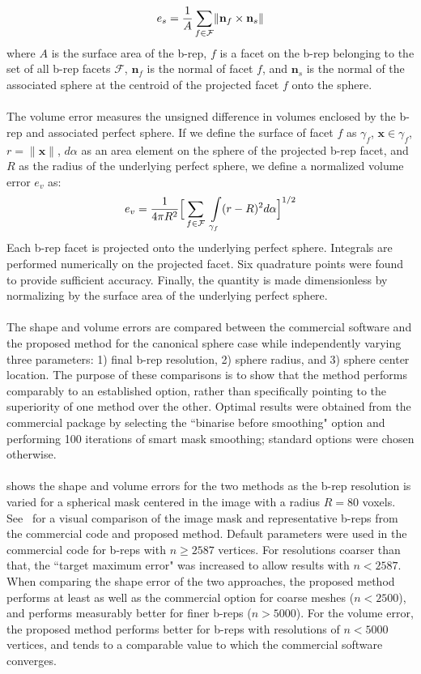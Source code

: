 \begin{equation} 
	e_s = \frac{1}{A} \sum \limits_{f\in\mathcal{F}} \lVert {\bf n}_f \times {\bf n}_s \rVert
\end{equation}
where $A$ is the surface area of the b-rep, $f$ is a facet on the b-rep belonging to the set of all b-rep facets $\mathcal{F}$, ${\bm n}_f$ is the normal of facet $f$, and ${\bm n}_s$ is the normal of the associated sphere at the centroid of the projected facet $f$ onto the sphere. \\ \\
%
The volume error measures the unsigned difference in volumes enclosed by the b-rep and associated perfect sphere. If we define the surface of facet $f$ as $\gamma_f$,  ${\bm x} \in \gamma_f$, $r = \lVert {\bm x} \rVert$, $d\alpha$ as an area element on the sphere of the projected b-rep facet, and $R$ as the radius of the underlying perfect sphere, we define a normalized volume error $e_v$ as:
\begin{equation}
	e_v = \frac{1}{4\pi R^2} \Big[\sum \limits_{f \in \mathcal{F}\textsl{}} \ \int \limits_{\gamma_f} (r - R)^2 d\alpha \Big]^{1/2}
\end{equation}
Each b-rep facet is projected onto the underlying perfect sphere. Integrals are performed numerically on the projected facet. Six quadrature points were found to provide sufficient accuracy. Finally, the quantity is made dimensionless by normalizing by the surface area of the underlying perfect sphere.
\\ \\
%
The shape and volume errors are compared between the commercial software and the proposed method for the canonical sphere case while independently varying three parameters: 1) final b-rep resolution, 2) sphere radius, and 3) sphere center location. The purpose of these comparisons is to show that the method performs comparably to an established option, rather than specifically pointing to the superiority of one method over the other. Optimal results were obtained from the commercial package by selecting the ``binarise before smoothing" option and performing 100 iterations of smart mask smoothing; standard options were chosen otherwise. \\ \\
%
 shows the shape and volume errors for the two methods as the b-rep resolution is varied for a spherical mask centered in the image with a radius $R = 80$ voxels. See~ for a visual comparison of the image mask and representative b-reps from the commercial code and proposed method. Default parameters were used in the commercial code for b-reps with $n \ge 2587$ vertices. For resolutions coarser than that, the ``target maximum error" was increased to allow results with $n < 2587$. When comparing the shape error of the two approaches, the proposed method performs at least as well as the commercial option for coarse meshes ($n < 2500$), and performs measurably better for finer b-reps ($n > 5000$). For the volume error, the proposed method performs better for b-reps with resolutions of $n < 5000$ vertices, and tends to a comparable value to which the commercial software converges.
